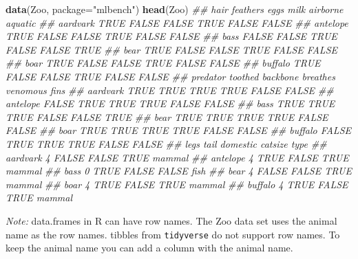 \documentclass[
  notitlepage]{book}
\newenvironment{Shaded}{\begin{snugshade}}{\end{snugshade}}
\newcommand{\CommentTok}[1]{\textcolor[rgb]{0.56,0.35,0.01}{\textit{#1}}}
\newcommand{\DataTypeTok}[1]{\textcolor[rgb]{0.13,0.29,0.53}{#1}}
\newcommand{\KeywordTok}[1]{\textcolor[rgb]{0.13,0.29,0.53}{\textbf{#1}}}
\newcommand{\NormalTok}[1]{#1}
\newcommand{\StringTok}[1]{\textcolor[rgb]{0.31,0.60,0.02}{#1}}
\begin{document}
\begin{Shaded}
\begin{Highlighting}[]
\KeywordTok{data}\NormalTok{(Zoo, }\DataTypeTok{package=}\StringTok{"mlbench"}\NormalTok{)}
\KeywordTok{head}\NormalTok{(Zoo)}
\CommentTok{\#\#           hair feathers  eggs  milk airborne aquatic}
\CommentTok{\#\# aardvark  TRUE    FALSE FALSE  TRUE    FALSE   FALSE}
\CommentTok{\#\# antelope  TRUE    FALSE FALSE  TRUE    FALSE   FALSE}
\CommentTok{\#\# bass     FALSE    FALSE  TRUE FALSE    FALSE    TRUE}
\CommentTok{\#\# bear      TRUE    FALSE FALSE  TRUE    FALSE   FALSE}
\CommentTok{\#\# boar      TRUE    FALSE FALSE  TRUE    FALSE   FALSE}
\CommentTok{\#\# buffalo   TRUE    FALSE FALSE  TRUE    FALSE   FALSE}
\CommentTok{\#\#          predator toothed backbone breathes venomous  fins}
\CommentTok{\#\# aardvark     TRUE    TRUE     TRUE     TRUE    FALSE FALSE}
\CommentTok{\#\# antelope    FALSE    TRUE     TRUE     TRUE    FALSE FALSE}
\CommentTok{\#\# bass         TRUE    TRUE     TRUE    FALSE    FALSE  TRUE}
\CommentTok{\#\# bear         TRUE    TRUE     TRUE     TRUE    FALSE FALSE}
\CommentTok{\#\# boar         TRUE    TRUE     TRUE     TRUE    FALSE FALSE}
\CommentTok{\#\# buffalo     FALSE    TRUE     TRUE     TRUE    FALSE FALSE}
\CommentTok{\#\#          legs  tail domestic catsize   type}
\CommentTok{\#\# aardvark    4 FALSE    FALSE    TRUE mammal}
\CommentTok{\#\# antelope    4  TRUE    FALSE    TRUE mammal}
\CommentTok{\#\# bass        0  TRUE    FALSE   FALSE   fish}
\CommentTok{\#\# bear        4 FALSE    FALSE    TRUE mammal}
\CommentTok{\#\# boar        4  TRUE    FALSE    TRUE mammal}
\CommentTok{\#\# buffalo     4  TRUE    FALSE    TRUE mammal}
\end{Highlighting}
\end{Shaded}

\emph{Note:} data.frames in R can have row names. The Zoo data set uses the
animal name as the row names. tibbles from \texttt{tidyverse} do not support
row names. To keep the animal name you can add a column with the animal
name.
\end{document}
